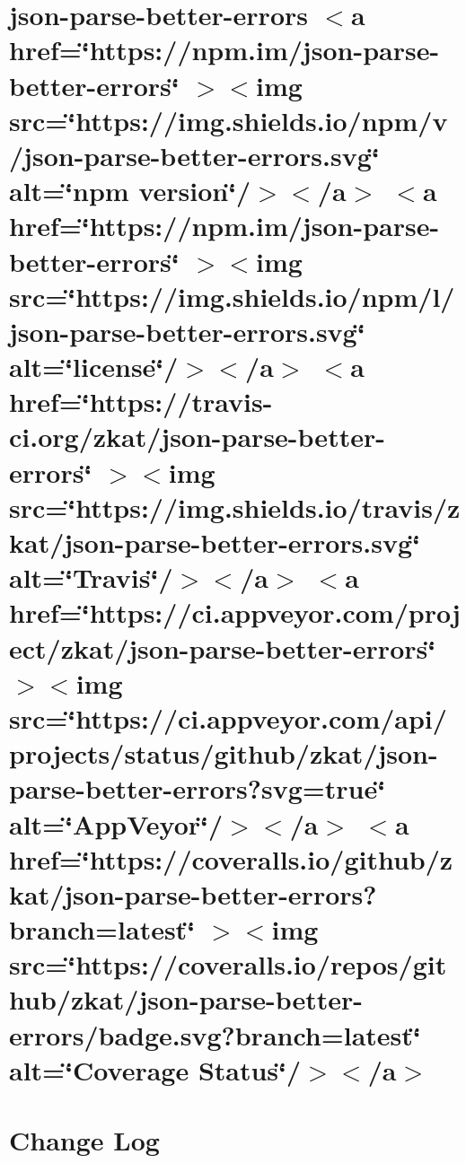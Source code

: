 \documentclass[twoside]{book}
\newcommand{\+}{\discretionary{\mbox{\scriptsize$\hookleftarrow$}}{}{}}
\begin{document}
\chapter{json-\/parse-\/better-\/errors \texorpdfstring{$<$}{<}a href=\char`\"{}https\+://npm.\+im/json-\/parse-\/better-\/errors\char`\"{} \texorpdfstring{$>$}{>}\texorpdfstring{$<$}{<}img src=\char`\"{}https\+://img.\+shields.\+io/npm/v/json-\/parse-\/better-\/errors.\+svg\char`\"{} alt=\char`\"{}npm version\char`\"{}/\texorpdfstring{$>$}{>}\texorpdfstring{$<$}{<}/a\texorpdfstring{$>$}{>} \texorpdfstring{$<$}{<}a href=\char`\"{}https\+://npm.\+im/json-\/parse-\/better-\/errors\char`\"{} \texorpdfstring{$>$}{>}\texorpdfstring{$<$}{<}img src=\char`\"{}https\+://img.\+shields.\+io/npm/l/json-\/parse-\/better-\/errors.\+svg\char`\"{} alt=\char`\"{}license\char`\"{}/\texorpdfstring{$>$}{>}\texorpdfstring{$<$}{<}/a\texorpdfstring{$>$}{>} \texorpdfstring{$<$}{<}a href=\char`\"{}https\+://travis-\/ci.\+org/zkat/json-\/parse-\/better-\/errors\char`\"{} \texorpdfstring{$>$}{>}\texorpdfstring{$<$}{<}img src=\char`\"{}https\+://img.\+shields.\+io/travis/zkat/json-\/parse-\/better-\/errors.\+svg\char`\"{} alt=\char`\"{}\+Travis\char`\"{}/\texorpdfstring{$>$}{>}\texorpdfstring{$<$}{<}/a\texorpdfstring{$>$}{>} \texorpdfstring{$<$}{<}a href=\char`\"{}https\+://ci.\+appveyor.\+com/project/zkat/json-\/parse-\/better-\/errors\char`\"{} \texorpdfstring{$>$}{>}\texorpdfstring{$<$}{<}img src=\char`\"{}https\+://ci.\+appveyor.\+com/api/projects/status/github/zkat/json-\/parse-\/better-\/errors?svg=true\char`\"{} alt=\char`\"{}\+App\+Veyor\char`\"{}/\texorpdfstring{$>$}{>}\texorpdfstring{$<$}{<}/a\texorpdfstring{$>$}{>} \texorpdfstring{$<$}{<}a href=\char`\"{}https\+://coveralls.\+io/github/zkat/json-\/parse-\/better-\/errors?branch=latest\char`\"{} \texorpdfstring{$>$}{>}\texorpdfstring{$<$}{<}img src=\char`\"{}https\+://coveralls.\+io/repos/github/zkat/json-\/parse-\/better-\/errors/badge.\+svg?branch=latest\char`\"{} alt=\char`\"{}\+Coverage Status\char`\"{}/\texorpdfstring{$>$}{>}\texorpdfstring{$<$}{<}/a\texorpdfstring{$>$}{>}}
\label{md__c___users_vaishnavi_jadhav__desktop__developer_code_mean_stack_example_client_node_modules_jbb80b22f2af50a850b8e7ab078d4bf7e}

\chapter{Change Log}
\label{md__c___users_vaishnavi_jadhav__desktop__developer_code_mean_stack_example_client_node_modules_j7d8da886db9a598f2b615362b37a2e32}

\end{document}
